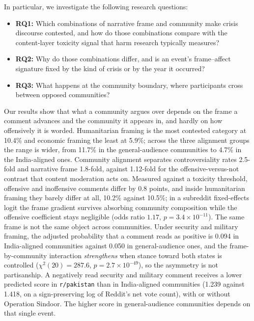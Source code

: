 In particular, we investigate the following research questions:

\begin{itemize}
\item \textbf{RQ1:} Which combinations of narrative frame and community make crisis discourse contested, and how do those combinations compare with the content-layer toxicity signal that harm research typically measures?
\item \textbf{RQ2:} Why do those combinations differ, and is an event's frame--affect signature fixed by the kind of crisis or by the year it occurred?
\item \textbf{RQ3:} What happens at the community boundary, where participants cross between opposed communities?
\end{itemize}

Our results show that what a community argues over depends on the frame a comment advances and the community it appears in, and hardly on how offensively it is worded. Humanitarian framing is the most contested category at 10.4\% and economic framing the least at 5.9\%; across the three alignment groups the range is wider, from 11.7\% in the general-audience communities to 4.7\% in the India-aligned ones. Community alignment separates controversiality rates 2.5-fold and narrative frame 1.8-fold, against 1.12-fold for the offensive-versus-not contrast that content moderation acts on. Measured against a toxicity threshold, offensive and inoffensive comments differ by 0.8 points, and inside humanitarian framing they barely differ at all, 10.2\% against 10.5\%; in a subreddit fixed-effects logit the frame gradient survives absorbing community composition while the offensive coefficient stays negligible (odds ratio $1.17$, $p = 3.4\times10^{-11}$). 
The same frame is not the same object across communities. Under security and military framing, the adjusted probability that a comment reads as positive is 0.094 in India-aligned communities against 0.050 in general-audience ones, and the frame-by-community interaction \emph{strengthens} when stance toward both states is controlled ($\chi^2(20) = 287.6$, $p = 2.7\times10^{-49}$), so the asymmetry is not partisanship. 
A negatively read security and military comment receives a lower predicted score in \texttt{r/pakistan} than in India-aligned communities (1.239 against 1.418, on a sign-preserving log of Reddit's net vote count), with or without Operation Sindoor. The higher score in general-audience communities depends on that single event. 
